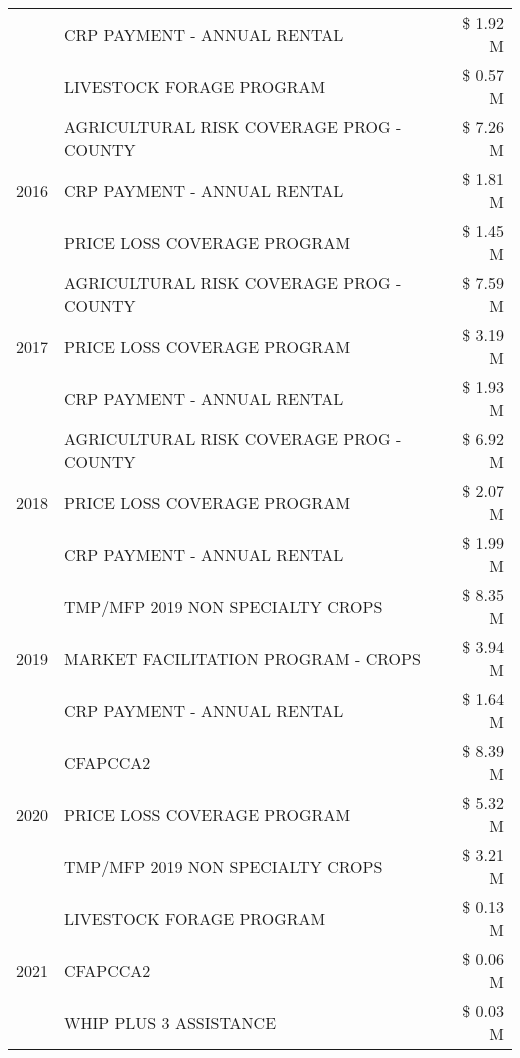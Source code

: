 \begin{tabular}{llr}
 & CRP PAYMENT - ANNUAL RENTAL & \$ 1.92 M \\
 & LIVESTOCK FORAGE PROGRAM & \$ 0.57 M \\
\cline{1-3}
\multirow[t]{3}{*}{2016} & AGRICULTURAL RISK COVERAGE PROG - COUNTY & \$ 7.26 M \\
 & CRP PAYMENT - ANNUAL RENTAL & \$ 1.81 M \\
 & PRICE LOSS COVERAGE PROGRAM & \$ 1.45 M \\
\cline{1-3}
\multirow[t]{3}{*}{2017} & AGRICULTURAL RISK COVERAGE PROG - COUNTY & \$ 7.59 M \\
 & PRICE LOSS COVERAGE PROGRAM & \$ 3.19 M \\
 & CRP PAYMENT - ANNUAL RENTAL & \$ 1.93 M \\
\cline{1-3}
\multirow[t]{3}{*}{2018} & AGRICULTURAL RISK COVERAGE PROG - COUNTY & \$ 6.92 M \\
 & PRICE LOSS COVERAGE PROGRAM & \$ 2.07 M \\
 & CRP PAYMENT - ANNUAL RENTAL & \$ 1.99 M \\
\cline{1-3}
\multirow[t]{3}{*}{2019} & TMP/MFP 2019 NON SPECIALTY CROPS & \$ 8.35 M \\
 & MARKET FACILITATION PROGRAM - CROPS & \$ 3.94 M \\
 & CRP PAYMENT - ANNUAL RENTAL & \$ 1.64 M \\
\cline{1-3}
\multirow[t]{3}{*}{2020} & CFAPCCA2 & \$ 8.39 M \\
 & PRICE LOSS COVERAGE PROGRAM & \$ 5.32 M \\
 & TMP/MFP 2019 NON SPECIALTY CROPS & \$ 3.21 M \\
\cline{1-3}
\multirow[t]{3}{*}{2021} & LIVESTOCK FORAGE PROGRAM & \$ 0.13 M \\
 & CFAPCCA2 & \$ 0.06 M \\
 & WHIP PLUS 3 ASSISTANCE & \$ 0.03 M \\
\cline{1-3}
\bottomrule
\end{tabular}
